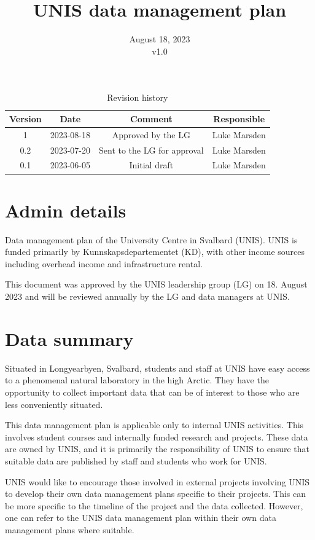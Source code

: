 \documentclass[a4paper,english, 11pt]{article}
\title{UNIS data management plan}
\date{August 18, 2023 \\v1.0}
\begin{document}
\maketitle
\begin{table}[b]
\centering
\caption{Revision history}
\begin{tabular}{cccc}
\toprule
Version & Date       & Comment                                      & Responsible \\
\midrule
1       & 2023-08-18 & Approved by the LG & Luke Marsden     \\
0.2       & 2023-07-20 & Sent to the LG for approval & Luke Marsden     \\
0.1     & 2023-06-05 & Initial draft & Luke Marsden     \\
\bottomrule
\end{tabular}
\end{table}
\newpage
\tableofcontents
\newpage

\section{Admin details}
\label{s:admin}

Data management plan of the University Centre in Svalbard (UNIS). UNIS is funded primarily by Kunnskapsdepartementet (KD), with other income sources including overhead income and infrastructure rental.

This document was approved by the UNIS leadership group (LG) on 18. August 2023 and will be reviewed annually by the LG and data managers at UNIS. 

\section{Data summary}
\label{s:data}

Situated in Longyearbyen, Svalbard, students and staff at UNIS have easy access to a phenomenal natural laboratory in the high Arctic. 
They have the opportunity to collect important data that can be of interest to those who are less conveniently situated.

This data management plan is applicable only to internal UNIS activities. This involves student courses and internally funded research and projects. These data are owned by UNIS, and it is primarily the responsibility of UNIS to ensure that suitable data are published by staff and students who work for UNIS. 

UNIS would like to encourage those involved in external projects involving UNIS to develop their own data management plans specific to their projects. This can be more specific to the timeline of the project and the data collected. However, one can refer to the UNIS data management plan within their own data management plans where suitable.
\end{document}
